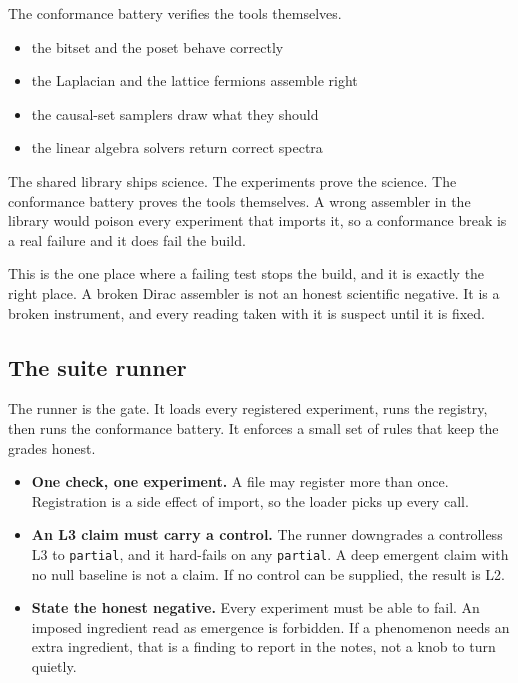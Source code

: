 The conformance battery verifies the tools themselves.

\begin{itemize}
\item the bitset and the poset behave correctly
\item the Laplacian and the lattice fermions assemble right
\item the causal-set samplers draw what they should
\item the linear algebra solvers return correct spectra
\end{itemize}

\begin{principle}
The shared library ships science. The experiments prove the science. The conformance battery proves the tools themselves. A wrong assembler in the library would poison every experiment that imports it, so a conformance break is a real failure and it does fail the build.
\end{principle}

This is the one place where a failing test stops the build, and it is exactly the right place. A broken Dirac assembler is not an honest scientific negative. It is a broken instrument, and every reading taken with it is suspect until it is fixed.

\subsection{The suite runner}

The runner is the gate. It loads every registered experiment, runs the registry, then runs the conformance battery. It enforces a small set of rules that keep the grades honest.

\begin{itemize}
\item \textbf{One check, one experiment.} A file may register more than once. Registration is a side effect of import, so the loader picks up every call.
\item \textbf{An L3 claim must carry a control.} The runner downgrades a controlless L3 to \texttt{partial}, and it hard-fails on any \texttt{partial}. A deep emergent claim with no null baseline is not a claim. If no control can be supplied, the result is L2.
\item \textbf{State the honest negative.} Every experiment must be able to fail. An imposed ingredient read as emergence is forbidden. If a phenomenon needs an extra ingredient, that is a finding to report in the notes, not a knob to turn quietly.
\end{itemize}

